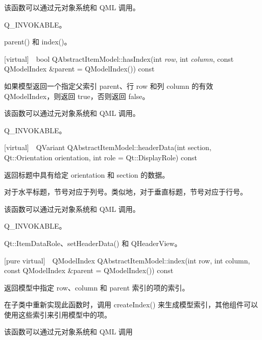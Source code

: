 \begin{notice}
该函数可以通过元对象系统和 QML 调用。
\end{notice}

\begin{seeAlso}
Q\_INVOKABLE。
\end{seeAlso}

\begin{seeAlso}
parent() 和 index()。
\end{seeAlso}

[virtual] bool QAbstractItemModel::hasIndex(int \emph{row}, int \emph{column}, const QModelIndex \&parent = QModelIndex()) const

如果模型返回一个指定父索引 parent、行 row 和列 column 的有效 QModelIndex，则返回 true，否则返回 false。


\begin{notice}
该函数可以通过元对象系统和 QML 调用。
\end{notice}

\begin{seeAlso}
Q\_INVOKABLE。
\end{seeAlso}

[virtual] QVariant QAbstractItemModel::headerData(int section, Qt::Orientation orientation, int role = Qt::DisplayRole) const

返回标题中具有给定 orientation 和 section 的数据。

对于水平标题，节号对应于列号。类似地，对于垂直标题，节号对应于行号。

\begin{notice}
该函数可以通过元对象系统和 QML 调用。
\end{notice}

\begin{seeAlso}
Q\_INVOKABLE。
\end{seeAlso}

\begin{seeAlso}
Qt::ItemDataRole、setHeaderData() 和 QHeaderView。
\end{seeAlso}

[pure virtual] QModelIndex QAbstractItemModel::index(int row, int column, const QModelIndex \&parent = QModelIndex()) const

返回模型中指定 row、column 和 parent 索引的项的索引。

在子类中重新实现此函数时，调用 createIndex() 来生成模型索引，其他组件可以使用这些索引来引用模型中的项。

\begin{notice}
该函数可以通过元对象系统和 QML 调用
\end{notice}

